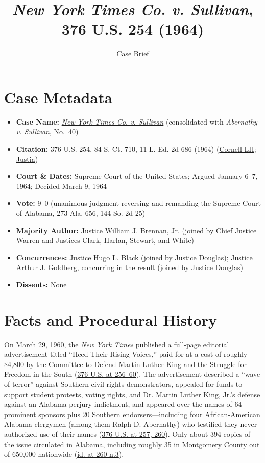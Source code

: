 \documentclass[12pt]{article}
\title{\textit{New York Times Co. v. Sullivan}, 376 U.S. 254 (1964)}
\author{Case Brief}
\date{}
\begin{document}
\maketitle


\section{Case Metadata}
\begin{itemize}
  \item \textbf{Case Name:} \textit{\href{https://supreme.justia.com/cases/federal/us/376/254/}{New York Times Co. v. Sullivan}} (consolidated with \textit{Abernathy v. Sullivan}, No.~40)
  \item \textbf{Citation:} 376 U.S. 254, 84 S. Ct. 710, 11 L. Ed. 2d 686 (1964) (\href{https://www.law.cornell.edu/supremecourt/text/376/254}{Cornell LII}; \href{https://supreme.justia.com/cases/federal/us/376/254/}{Justia})
  \item \textbf{Court \& Dates:} Supreme Court of the United States; Argued January 6--7, 1964; Decided March 9, 1964
  \item \textbf{Vote:} 9--0 (unanimous judgment reversing and remanding the Supreme Court of Alabama, 273 Ala. 656, 144 So. 2d 25)
  \item \textbf{Majority Author:} Justice William J. Brennan, Jr. (joined by Chief Justice Warren and Justices Clark, Harlan, Stewart, and White)
  \item \textbf{Concurrences:} Justice Hugo L. Black (joined by Justice Douglas); Justice Arthur J. Goldberg, concurring in the result (joined by Justice Douglas)
  \item \textbf{Dissents:} None
\end{itemize}

\section{Facts and Procedural History}
On March 29, 1960, the \textit{New York Times} published a full-page editorial advertisement titled ``Heed Their Rising Voices,'' paid for at a cost of roughly \$4,800 by the Committee to Defend Martin Luther King and the Struggle for Freedom in the South (\href{https://supreme.justia.com/cases/federal/us/376/254/}{376 U.S. at 256--60}). The advertisement described a ``wave of terror'' against Southern civil rights demonstrators, appealed for funds to support student protests, voting rights, and Dr. Martin Luther King, Jr.'s defense against an Alabama perjury indictment, and appeared over the names of 64 prominent sponsors plus 20 Southern endorsers---including four African-American Alabama clergymen (among them Ralph D. Abernathy) who testified they never authorized use of their names (\href{https://www.law.cornell.edu/supremecourt/text/376/254}{376 U.S. at 257, 260}). Only about 394 copies of the issue circulated in Alabama, including roughly 35 in Montgomery County out of 650,000 nationwide (\href{https://supreme.justia.com/cases/federal/us/376/254/}{id. at 260 n.3}).
\end{document}
